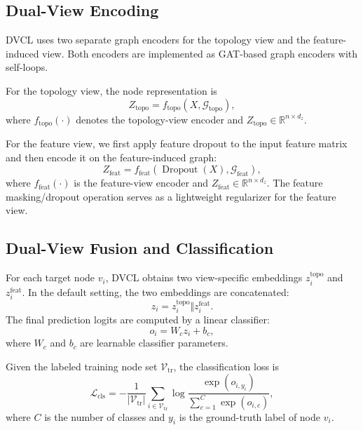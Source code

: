 \subsection{Dual-View Encoding}

DVCL uses two separate graph encoders for the topology view and the feature-induced view. Both encoders are implemented as GAT-based graph encoders with self-loops.

For the topology view, the node representation is
\begin{equation}
Z_{\mathrm{topo}}
=
f_{\mathrm{topo}}(X,\mathcal{G}_{\mathrm{topo}}),
\end{equation}
where $f_{\mathrm{topo}}(\cdot)$ denotes the topology-view encoder and
$Z_{\mathrm{topo}}\in\mathbb{R}^{n\times d_z}$.

For the feature view, we first apply feature dropout to the input feature matrix and then encode it on the feature-induced graph:
\begin{equation}
Z_{\mathrm{feat}}
=
f_{\mathrm{feat}}(\operatorname{Dropout}(X),\mathcal{G}_{\mathrm{feat}}),
\end{equation}
where $f_{\mathrm{feat}}(\cdot)$ is the feature-view encoder and
$Z_{\mathrm{feat}}\in\mathbb{R}^{n\times d_z}$. The feature masking/dropout operation serves as a lightweight regularizer for the feature view.

\subsection{Dual-View Fusion and Classification}

For each target node $v_i$, DVCL obtains two view-specific embeddings
$z_i^{\mathrm{topo}}$ and $z_i^{\mathrm{feat}}$. In the default setting, the two embeddings are concatenated:
\begin{equation}
z_i
=
z_i^{\mathrm{topo}}
\Vert
z_i^{\mathrm{feat}}.
\end{equation}
The final prediction logits are computed by a linear classifier:
\begin{equation}
o_i
=
W_c z_i + b_c,
\end{equation}
where $W_c$ and $b_c$ are learnable classifier parameters.

Given the labeled training node set $\mathcal{V}_{\mathrm{tr}}$, the classification loss is
\begin{equation}
\mathcal{L}_{\mathrm{cls}}
=
-\frac{1}{|\mathcal{V}_{\mathrm{tr}}|}
\sum_{i\in\mathcal{V}_{\mathrm{tr}}}
\log
\frac{\exp(o_{i,y_i})}
{\sum_{c=1}^{C}\exp(o_{i,c})},
\end{equation}
where $C$ is the number of classes and $y_i$ is the ground-truth label of node $v_i$.

